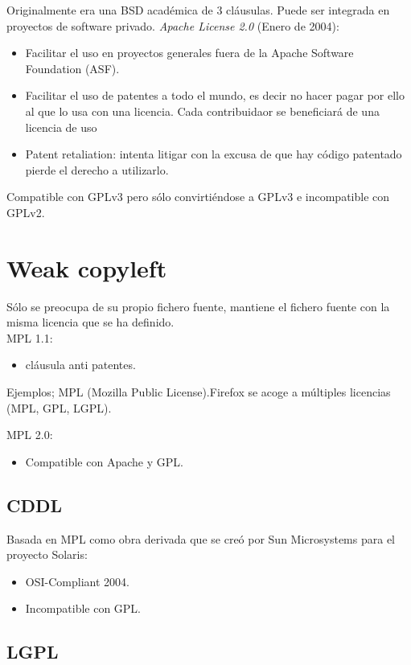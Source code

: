\documentclass[11pt]{scrartcl}
\begin{document}
Originalmente era una BSD acad\'emica de 3 cl\'ausulas.
Puede ser integrada en proyectos de software privado.
\emph{Apache License 2.0} (Enero de 2004):
\begin{itemize}
	\item Facilitar el uso en proyectos generales fuera de la Apache Software Foundation (ASF).
	\item Facilitar el uso de patentes a todo el mundo, es decir no hacer pagar por ello al que lo usa con una licencia. Cada contribuidaor se beneficiar\'a de una licencia de uso
	\item Patent retaliation: intenta litigar con la excusa de que hay c\'odigo patentado pierde el derecho a utilizarlo.
\end{itemize}

Compatible con GPLv3 pero s\'olo convirti\'endose a GPLv3 e incompatible con GPLv2.

\section{Weak copyleft}

S\'olo se preocupa de su propio fichero fuente, mantiene el fichero fuente con la misma licencia que se ha definido.\\

MPL 1.1:
\begin{itemize}
	\item cl\'ausula anti patentes.
\end{itemize}
Ejemplos; MPL (Mozilla Public License).Firefox se acoge a m\'ultiples licencias (MPL, GPL, LGPL).

MPL 2.0:
\begin{itemize}
	\item Compatible con Apache y GPL.
\end{itemize}

\subsection{CDDL}

Basada en MPL como obra derivada que se cre\'o por Sun Microsystems para el proyecto Solaris:
\begin{itemize}

	\item OSI-Compliant 2004.
	\item Incompatible con GPL.
\end{itemize}

\subsection{LGPL}
\end{document}
